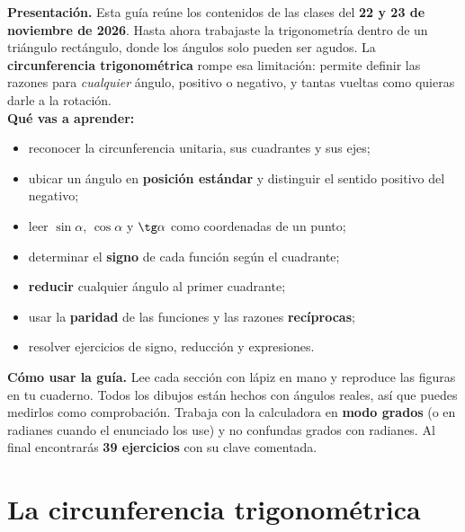 \documentclass[12pt, letterpaper]{article}
\providecommand{\sen}{\sin}
\begin{document}


\vspace{4pt}
\begin{cuadroinfo}
  \small
  \textbf{Presentación.} Esta guía reúne los contenidos de las clases del
  \textbf{22 y 23 de noviembre de 2026}. Hasta ahora trabajaste la
  trigonometría dentro de un triángulo rectángulo, donde los ángulos solo
  pueden ser agudos. La \textbf{circunferencia trigonométrica} rompe esa
  limitación: permite definir las razones para \emph{cualquier} ángulo,
  positivo o negativo, y tantas vueltas como quieras darle a la rotación.
  \\[4pt]
  \textbf{Qué vas a aprender:}
  \begin{itemize}[leftmargin=1.2em, nosep, topsep=2pt]
    \item reconocer la circunferencia unitaria, sus cuadrantes y sus ejes;
    \item ubicar un ángulo en \textbf{posición estándar} y distinguir el
          sentido positivo del negativo;
    \item leer $\sen\alpha$, $\cos\alpha$ y $\tg\alpha$ como coordenadas de
          un punto;
    \item determinar el \textbf{signo} de cada función según el cuadrante;
    \item \textbf{reducir} cualquier ángulo al primer cuadrante;
    \item usar la \textbf{paridad} de las funciones y las razones
          \textbf{recíprocas};
    \item resolver ejercicios de signo, reducción y expresiones.
  \end{itemize}
  \par\medskip
  \textbf{Cómo usar la guía.} Lee cada sección con lápiz en mano y reproduce
  las figuras en tu cuaderno. Todos los dibujos están hechos con ángulos
  reales, así que puedes medirlos como comprobación. Trabaja con la
  calculadora en \textbf{modo grados} (o en radianes cuando el enunciado los
  use) y no confundas grados con radianes. Al final encontrarás \textbf{39
  ejercicios} con su clave comentada.
\end{cuadroinfo}

\section{La circunferencia trigonométrica}
\end{document}
